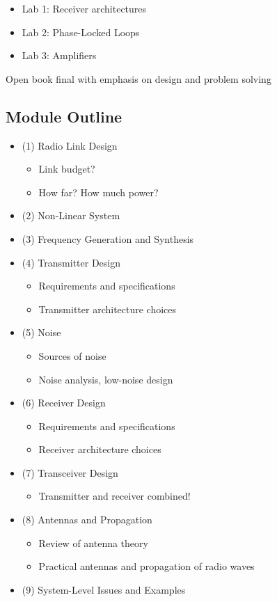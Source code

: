 \documentclass[12pt]{article}
\begin{document}
\begin{itemize}[noitemsep]
    \item Lab 1: Receiver architectures
    \item Lab 2: Phase-Locked Loops
    \item Lab 3: Amplifiers
\end{itemize}


Open book final with emphasis on design and problem solving

\subsection{Module Outline}

\begin{itemize}[noitemsep]
    \item (1) Radio Link Design
    \begin{itemize}[noitemsep]
        \item Link budget?
        \item How far? How much power?
    \end{itemize}
    \item (2) Non-Linear System
    \item (3) Frequency Generation and Synthesis
    \item (4) Transmitter Design
    \begin{itemize}[noitemsep]
        \item Requirements and specifications
        \item Transmitter architecture choices
    \end{itemize}
    \item (5) Noise
    \begin{itemize}[noitemsep]
        \item Sources of noise
        \item Noise analysis, low-noise design
    \end{itemize}
    \item (6) Receiver Design
    \begin{itemize}[noitemsep]
        \item Requirements and specifications
        \item Receiver architecture choices
    \end{itemize}
    \item (7) Transceiver Design
    \begin{itemize}[noitemsep]
        \item Transmitter and receiver combined!
    \end{itemize}
    \item (8) Antennas and Propagation
    \begin{itemize}[noitemsep]
        \item Review of antenna theory
        \item Practical antennas and propagation of radio waves
    \end{itemize}
    \item (9) System-Level Issues and Examples
\end{itemize}
\end{document}
